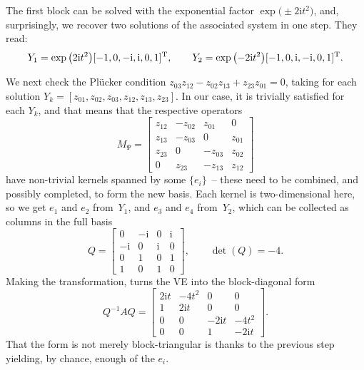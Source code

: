 \documentclass[pdftex]{sigma}
\numberwithin{equation}{section}
\begin{document}
The first block can be solved with the exponential factor
$\exp\big({\pm}2\mathrm{i}t^2\big)$, and, surprisingly, we recover two solutions
of the associated system in one step. They read:
\begin{gather*}
 Y_1 = \exp\big(2\mathrm{i}t^2\big) [ -1, 0, -\mathrm{i}, \mathrm{i}, 0, 1]^{\rm T},
 \qquad
 Y_2 = \exp\big({-}2\mathrm{i}t^2\big) [ -1, 0, \mathrm{i}, -\mathrm{i}, 0, 1]^{\rm T}.
\end{gather*}

We next check the Pl\"ucker condition
$z_{03} z_{12}-z_{02}z_{13}+z_{23}z_{01}=0$, taking for each solution
$Y_k = [z_{01},z_{02},z_{03}, z_{12},z_{13}, z_{23}]$. In our case, it
is trivially satisfied for each $Y_k$, and that means that the respective operators
\begin{equation*}
 M_{\Psi} = \begin{bmatrix}
 z_{12} & - z_{02} & z_{01} & 0\\
 z_{13} & -z_{03} & 0 & z_{01}\\
 z_{23} & 0 & -z_{03} & z_{02}\\
 0 & z_{23} & -z_{13} & z_{12}
 \end{bmatrix}
\end{equation*}
have non-trivial kernels spanned by some $\{e_i\}$~-- these need to be combined, and possibly completed, to form the new basis.
Each kernel is two-dimensional here, so we get $e_1$ and $e_2$ from~$Y_1$,
and $e_3$ and $e_4$ from~$Y_2$, which can be collected as columns in
the full basis
\begin{equation*}
 Q = \begin{bmatrix}
 0 & -\mathrm{i} & 0 & \mathrm{i}\\
 -\mathrm{i} & 0 & \mathrm{i} & 0\\
 0 & 1 & 0 & 1\\
 1 & 0 & 1 & 0
 \end{bmatrix}\!, \qquad \det(Q)=-4.
\end{equation*}
Making the transformation, turns the VE into the block-diagonal form
\begin{equation}
\label{a1}
 Q^{-1}AQ = \begin{bmatrix}
 2\mathrm{i}t & -4t^2 & 0 & 0\\
 1 & 2\mathrm{i} t & 0 & 0\\
 0 & 0 & -2\mathrm{i} t & -4t^2 \\
 0 & 0 & 1 & -2\mathrm{i}t
 \end{bmatrix}\!.
\end{equation}
That the form is not merely block-triangular is thanks to the previous step yielding, by chance, enough of the $e_i$.
\end{document}
